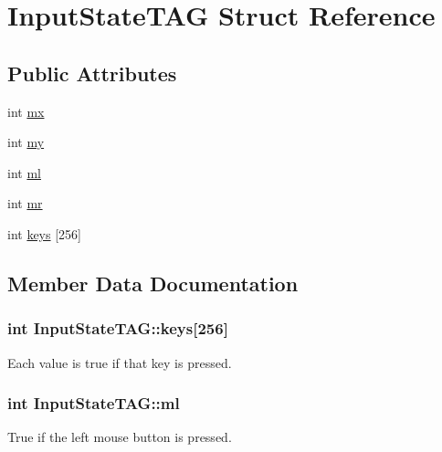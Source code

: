 \hypertarget{struct_input_state_t_a_g}{}\section{Input\+State\+T\+A\+G Struct Reference}
\label{struct_input_state_t_a_g}
\subsection*{Public Attributes}
\begin{DoxyCompactItemize}
\item 
int \hyperlink{struct_input_state_t_a_g_ab7d3dc6bbe1cf1fa6bd93a4b50300a92}{mx}
\item 
int \hyperlink{struct_input_state_t_a_g_a70ae2942b0b4a47cb26f52158ee65739}{my}
\item 
int \hyperlink{struct_input_state_t_a_g_af4a3ade74d81bab672bcf7e287f780f2}{ml}
\item 
int \hyperlink{struct_input_state_t_a_g_a35ba7fb1aba0fc64ec955edefef3d478}{mr}
\item 
int \hyperlink{struct_input_state_t_a_g_ab899f067e5476622b2897fb32a3d20b6}{keys} \mbox{[}256\mbox{]}
\end{DoxyCompactItemize}


\subsection{Member Data Documentation}
\hypertarget{struct_input_state_t_a_g_ab899f067e5476622b2897fb32a3d20b6}{}
\subsubsection[{keys}]{\setlength{\rightskip}{0pt plus 5cm}int Input\+State\+T\+A\+G\+::keys\mbox{[}256\mbox{]}}\label{struct_input_state_t_a_g_ab899f067e5476622b2897fb32a3d20b6}
Each value is true if that key is pressed. \hypertarget{struct_input_state_t_a_g_af4a3ade74d81bab672bcf7e287f780f2}{}
\subsubsection[{ml}]{\setlength{\rightskip}{0pt plus 5cm}int Input\+State\+T\+A\+G\+::ml}\label{struct_input_state_t_a_g_af4a3ade74d81bab672bcf7e287f780f2}
True if the left mouse button is pressed. \hypertarget{struct_input_state_t_a_g_a35ba7fb1aba0fc64ec955edefef3d478}{}
